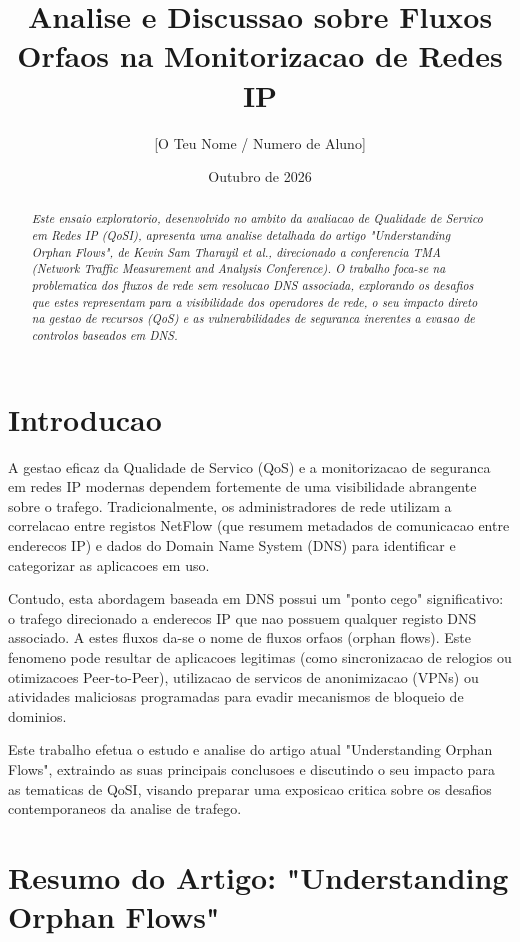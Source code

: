 \documentclass[11pt, a4paper]{article}
\title{Analise e Discussao sobre Fluxos Orfaos na Monitorizacao de Redes IP}
\author{[O Teu Nome / Numero de Aluno]}
\date{Outubro de 2026}
\begin{document}
\maketitle

\begin{abstract}
\textit{Este ensaio exploratorio, desenvolvido no ambito da avaliacao de Qualidade de Servico em Redes IP (QoSI), apresenta uma analise detalhada do artigo "Understanding Orphan Flows", de Kevin Sam Tharayil et al., direcionado a conferencia TMA (Network Traffic Measurement and Analysis Conference). O trabalho foca-se na problematica dos fluxos de rede sem resolucao DNS associada, explorando os desafios que estes representam para a visibilidade dos operadores de rede, o seu impacto direto na gestao de recursos (QoS) e as vulnerabilidades de seguranca inerentes a evasao de controlos baseados em DNS.}
\end{abstract}

\section{Introducao}
A gestao eficaz da Qualidade de Servico (QoS) e a monitorizacao de seguranca em redes IP modernas dependem fortemente de uma visibilidade abrangente sobre o trafego. Tradicionalmente, os administradores de rede utilizam a correlacao entre registos NetFlow (que resumem metadados de comunicacao entre enderecos IP) e dados do Domain Name System (DNS) para identificar e categorizar as aplicacoes em uso.

Contudo, esta abordagem baseada em DNS possui um "ponto cego" significativo: o trafego direcionado a enderecos IP que nao possuem qualquer registo DNS associado. A estes fluxos da-se o nome de fluxos orfaos (orphan flows). Este fenomeno pode resultar de aplicacoes legitimas (como sincronizacao de relogios ou otimizacoes Peer-to-Peer), utilizacao de servicos de anonimizacao (VPNs) ou atividades maliciosas programadas para evadir mecanismos de bloqueio de dominios.

Este trabalho efetua o estudo e analise do artigo atual "Understanding Orphan Flows", extraindo as suas principais conclusoes e discutindo o seu impacto para as tematicas de QoSI, visando preparar uma exposicao critica sobre os desafios contemporaneos da analise de trafego.

\section{Resumo do Artigo: "Understanding Orphan Flows"}
\end{document}

